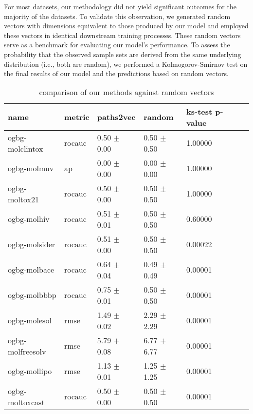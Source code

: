 For most datasets, our methodology did not yield significant outcomes for the majority of the datasets. To validate this observation, we generated random vectors with dimensions equivalent to those produced by our model and employed these vectors in identical downstream training processes. These random vectors serve as a benchmark for evaluating our model's performance. To assess the probability that the observed sample sets are derived from the same underlying distribution (i.e., both are random), we performed a Kolmogorov-Smirnov test on the final results of our model and the predictions based on random vectors.

\begin{table}[h!]
    \centering
    \begin{tabular}{@{}lllllll@{}}
        \toprule
        name             & metric & paths2vec       & random          & ks-test p-value \\ \midrule
        ogbg-molclintox  & rocauc & 0.50 $\pm$ 0.00 & 0.50 $\pm$ 0.50 & 1.00000         \\
        ogbg-molmuv      & ap     & 0.00 $\pm$ 0.00 & 0.00 $\pm$ 0.00 & 1.00000         \\
        ogbg-moltox21    & rocauc & 0.50 $\pm$ 0.00 & 0.50 $\pm$ 0.50 & 1.00000         \\
        ogbg-molhiv      & rocauc & 0.51 $\pm$ 0.01 & 0.50 $\pm$ 0.50 & 0.60000         \\
        ogbg-molsider    & rocauc & 0.51 $\pm$ 0.00 & 0.50 $\pm$ 0.50 & 0.00022         \\
        ogbg-molbace     & rocauc & 0.64 $\pm$ 0.04 & 0.49 $\pm$ 0.49 & 0.00001         \\
        ogbg-molbbbp     & rocauc & 0.75 $\pm$ 0.01 & 0.50 $\pm$ 0.50 & 0.00001         \\
        ogbg-molesol     & rmse   & 1.49 $\pm$ 0.02 & 2.29 $\pm$ 2.29 & 0.00001         \\
        ogbg-molfreesolv & rmse   & 5.79 $\pm$ 0.08 & 6.77 $\pm$ 6.77 & 0.00001         \\
        ogbg-mollipo     & rmse   & 1.13 $\pm$ 0.01 & 1.25 $\pm$ 1.25 & 0.00001         \\
        ogbg-moltoxcast  & rocauc & 0.50 $\pm$ 0.00 & 0.50 $\pm$ 0.50 & 0.00001         \\ \bottomrule
    \end{tabular}
    \caption{comparison of our methods against random vectors}
    \label{table:ogbg-molfreesolv_results}
\end{table}


